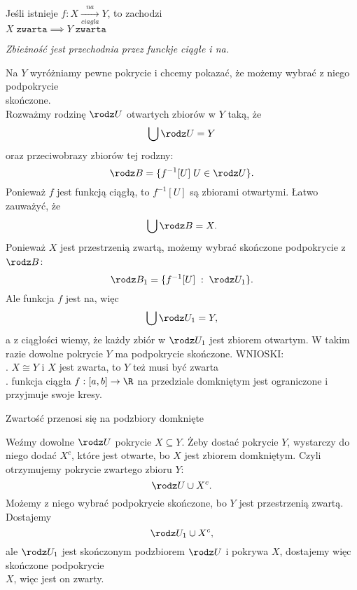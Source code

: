 \begin{center}\large
    Jeśli istnieje $f:X\xrightarrow[ciagla]{na} Y$, to zachodzi\smallskip\\
    $X\;\texttt{zwarta}\implies Y\;\texttt{zwarta}$\bigskip

    \emph{\normalsize{\color{def}Zbieżność jest przechodnia przez funckje ciągłe i na}.}
\end{center}
\dowod
Na $Y$ wyróżniamy pewne pokrycie i chcemy pokazać, że możemy wybrać z niego podpokrycie \\skończone.\medskip\\
Rozważmy rodzinę $\rodz U$ otwartych zbiorów w $Y$ taką, że
$$\bigcup\rodz U=Y$$
oraz przeciwobrazy zbiorów tej rodzny:
$$\rodz B=\{f^{-1}[U]\;U\in\rodz U\}.$$
Ponieważ $f$ jest funkcją ciągłą, to $f^{-1}[U]$ są zbiorami otwartymi. Łatwo zauważyć, że
$$\bigcup \rodz B=X.$$
Ponieważ $X$ jest przestrzenią zwartą, możemy wybrać skończone podpokrycie z $\rodz B$: 
$$\rodz B_1=\{f^{-1}[U]\;:\;\rodz U_1\}.$$
Ale funkcja $f$ jest na, więc
$$\bigcup\rodz U_1=Y,$$
a z ciągłości wiemy, że każdy zbiór w $\rodz U_1$ jest zbiorem otwartym. W takim razie dowolne pokrycie $Y$ ma podpokrycie skończone.
\kondow
{\large\color{acc}WNIOSKI:}\medskip\\
. $X\cong Y$ i $X$ jest zwarta, to $Y$ też musi być zwarta\smallskip\\
. funkcja ciągła $f:[a,b]\to \R$ na przedziale domkniętym jest ograniczone i przyjmuje swoje kresy.\bigskip\\
\bigskip

\begin{center}\large
    Zwartość przenosi się na podzbiory domknięte
\end{center}\bigskip
\dowod
Weźmy dowolne $\rodz U$ pokrycie $X\subseteq Y$. Żeby dostać pokrycie $Y$, wystarczy do niego dodać $X^c$, które jest otwarte, bo $X$ jest zbiorem domkniętym. Czyli otrzymujemy pokrycie zwartego zbioru $Y$:
$$\rodz U\cup X^c.$$
Możemy z niego wybrać podpokrycie skończone, bo $Y$ jest przestrzenią zwartą. Dostajemy
$$\rodz U_1\cup X^c,$$
ale $\rodz U_1$ jest skończonym podzbiorem $\rodz U$ i pokrywa $X$, dostajemy więc skończone podpokrycie \\$X$, więc jest on zwarty.
\kondow

